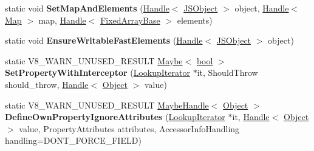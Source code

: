 \begin{DoxyCompactItemize}
\item 
\mbox{\label{classv8_1_1internal_1_1JSObject_a05e4934b13dffffd69ce05afe5970e22}} 
static void {\bfseries Set\+Map\+And\+Elements} (\mbox{\hyperlink{classv8_1_1internal_1_1Handle}{Handle}}$<$ \mbox{\hyperlink{classv8_1_1internal_1_1JSObject}{J\+S\+Object}} $>$ object, \mbox{\hyperlink{classv8_1_1internal_1_1Handle}{Handle}}$<$ \mbox{\hyperlink{classv8_1_1internal_1_1Map}{Map}} $>$ map, \mbox{\hyperlink{classv8_1_1internal_1_1Handle}{Handle}}$<$ \mbox{\hyperlink{classv8_1_1internal_1_1FixedArrayBase}{Fixed\+Array\+Base}} $>$ elements)
\item 
\mbox{\label{classv8_1_1internal_1_1JSObject_a860fbef55494992879f2417330a6b6fc}} 
static void {\bfseries Ensure\+Writable\+Fast\+Elements} (\mbox{\hyperlink{classv8_1_1internal_1_1Handle}{Handle}}$<$ \mbox{\hyperlink{classv8_1_1internal_1_1JSObject}{J\+S\+Object}} $>$ object)
\item 
\mbox{\label{classv8_1_1internal_1_1JSObject_a5582b53f7d7c5abab535b4b65663d48a}} 
static V8\+\_\+\+W\+A\+R\+N\+\_\+\+U\+N\+U\+S\+E\+D\+\_\+\+R\+E\+S\+U\+LT \mbox{\hyperlink{classv8_1_1Maybe}{Maybe}}$<$ \mbox{\hyperlink{classbool}{bool}} $>$ {\bfseries Set\+Property\+With\+Interceptor} (\mbox{\hyperlink{classv8_1_1internal_1_1LookupIterator}{Lookup\+Iterator}} $\ast$it, Should\+Throw should\+\_\+throw, \mbox{\hyperlink{classv8_1_1internal_1_1Handle}{Handle}}$<$ \mbox{\hyperlink{classv8_1_1internal_1_1Object}{Object}} $>$ value)
\item 
\mbox{\label{classv8_1_1internal_1_1JSObject_a7be0a80a7b622e42791a8f8b28db7ec9}} 
static V8\+\_\+\+W\+A\+R\+N\+\_\+\+U\+N\+U\+S\+E\+D\+\_\+\+R\+E\+S\+U\+LT \mbox{\hyperlink{classv8_1_1internal_1_1MaybeHandle}{Maybe\+Handle}}$<$ \mbox{\hyperlink{classv8_1_1internal_1_1Object}{Object}} $>$ {\bfseries Define\+Own\+Property\+Ignore\+Attributes} (\mbox{\hyperlink{classv8_1_1internal_1_1LookupIterator}{Lookup\+Iterator}} $\ast$it, \mbox{\hyperlink{classv8_1_1internal_1_1Handle}{Handle}}$<$ \mbox{\hyperlink{classv8_1_1internal_1_1Object}{Object}} $>$ value, Property\+Attributes attributes, Accessor\+Info\+Handling handling=D\+O\+N\+T\+\_\+\+F\+O\+R\+C\+E\+\_\+\+F\+I\+E\+LD)
\item 
\mbox{\label{classv8_1_1internal_1_1JSObject_a852a8ac6cb14bc3bcf6c0655af212bf4}} 

\end{DoxyCompactItemize}
